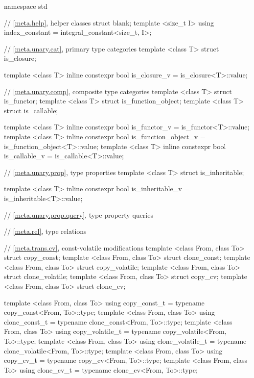 \documentclass[ebook,10pt,oneside,openany,final]{memoir}
\begin{document}
%
%
\begin{codeblock}
namespace std {
    // \ref{meta.help}, helper classes
    struct blank;
    template <size_t I> using index_constant = integral_constant<size_t, I>;
    
    // \ref{meta.unary.cat}, primary type categories
    template <class T> struct is_closure;

    template <class T>
    inline constexpr bool is_closure_v = is_closure<T>::value;
    
    // \ref{meta.unary.comp}, composite type categories
    template <class T> struct is_functor;
    template <class T> struct is_function_object;
    template <class T> struct is_callable;

    template <class T>
    inline constexpr bool is_functor_v = is_functor<T>::value;
    template <class T>
    inline constexpr bool is_function_object_v = is_function_object<T>::value;
    template <class T>
    inline constexpr bool is_callable_v = is_callable<T>::value;
    
    // \ref{meta.unary.prop}, type properties
    template <class T> struct is_inheritable;

    template <class T>
    inline constexpr bool is_inheritable_v = is_inheritable<T>::value;
    
    // \ref{meta.unary.prop.query}, type property queries
    
    // \ref{meta.rel}, type relations
    
    // \ref{meta.trans.cv}, const-volatile modifications
    template <class From, class To> struct copy_const;
    template <class From, class To> struct clone_const;
    template <class From, class To> struct copy_volatile;
    template <class From, class To> struct clone_volatile;
    template <class From, class To> struct copy_cv;
    template <class From, class To> struct clone_cv;

    template <class From, class To>
    using copy_const_t = typename copy_const<From, To>::type;
    template <class From, class To>
    using clone_const_t = typename clone_const<From, To>::type;
    template <class From, class To>
    using copy_volatile_t = typename copy_volatile<From, To>::type;
    template <class From, class To>
    using clone_volatile_t = typename clone_volatile<From, To>::type;
    template <class From, class To>
    using copy_cv_t = typename copy_cv<From, To>::type;
    template <class From, class To>
    using clone_cv_t = typename clone_cv<From, To>::type;
    
}
\end{codeblock}
\end{document}
